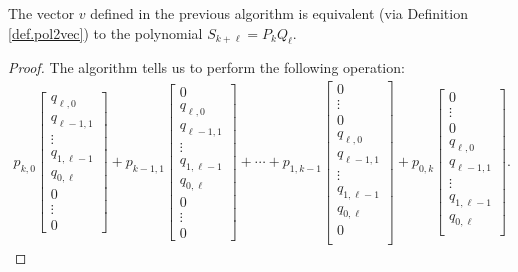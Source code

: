 \begin{proposition}
The vector $v$ defined in the previous algorithm is equivalent (via Definition \ref{def.pol2vec}) to the polynomial $S_{k+\ell}=P_kQ_{\ell}$.
\begin{proof}
The algorithm tells us to perform the following operation:
\begin{align*}
p_{k,0}
\begin{bmatrix}
q_{\ell,0}\\
q_{\ell-1,1}\\
\vdots\\
q_{1,\ell-1}\\
q_{0,\ell}\\
0\\
\vdots\\
0
\end{bmatrix}
+p_{k-1,1}
\begin{bmatrix}
0\\
q_{\ell,0}\\
q_{\ell-1,1}\\
\vdots\\
q_{1,\ell-1}\\
q_{0,\ell}\\
0\\
\vdots\\
0
\end{bmatrix}
+\cdots+p_{1,k-1}
\begin{bmatrix}
0\\
\vdots\\
0\\
q_{\ell,0}\\
q_{\ell-1,1}\\
\vdots\\
q_{1,\ell-1}\\
q_{0,\ell}\\
0\\
\end{bmatrix}
+p_{0,k}
\begin{bmatrix}
0\\
\vdots\\
0\\
q_{\ell,0}\\
q_{\ell-1,1}\\
\vdots\\
q_{1,\ell-1}\\
q_{0,\ell}\\
\end{bmatrix}.
\end{align*}


\end{proof}
\end{proposition}
